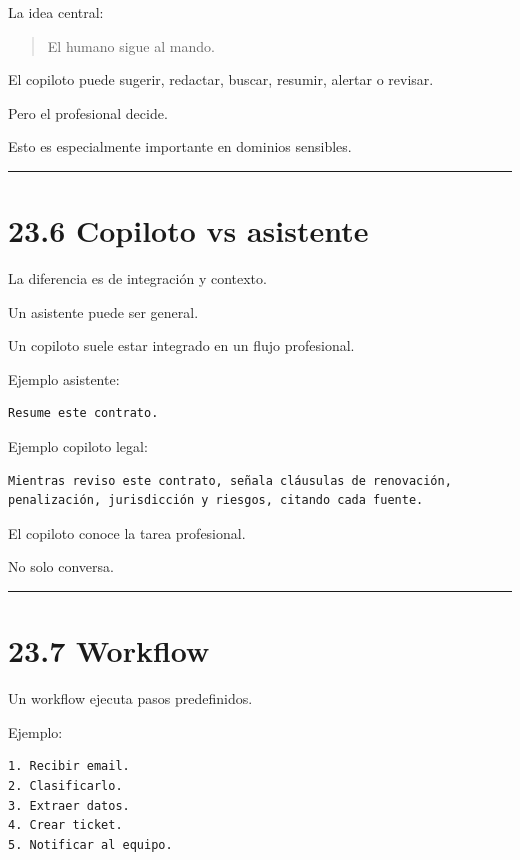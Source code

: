 La idea central:

\begin{quote}
El humano sigue al mando.
\end{quote}

El copiloto puede sugerir, redactar, buscar, resumir, alertar o revisar.

Pero el profesional decide.

Esto es especialmente importante en dominios sensibles.

\begin{center}\rule{0.5\linewidth}{0.5pt}\end{center}

\section{23.6 Copiloto vs asistente}\label{copiloto-vs-asistente}

La diferencia es de integración y contexto.

Un asistente puede ser general.

Un copiloto suele estar integrado en un flujo profesional.

Ejemplo asistente:

\begin{lstlisting}
Resume este contrato.
\end{lstlisting}

Ejemplo copiloto legal:

\begin{lstlisting}
Mientras reviso este contrato, señala cláusulas de renovación, penalización, jurisdicción y riesgos, citando cada fuente.
\end{lstlisting}

El copiloto conoce la tarea profesional.

No solo conversa.

\begin{center}\rule{0.5\linewidth}{0.5pt}\end{center}

\section{23.7 Workflow}\label{workflow}

Un workflow ejecuta pasos predefinidos.

Ejemplo:

\begin{lstlisting}
1. Recibir email.
2. Clasificarlo.
3. Extraer datos.
4. Crear ticket.
5. Notificar al equipo.
\end{lstlisting}

